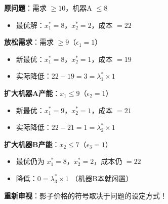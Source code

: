 \documentclass[12pt, a4paper]{ctexart}
\begin{document}
\begin{blackboard}[验证：放松约束后重新求解]

\textbf{原问题}：需求 $\geq 10$，机器A $\leq 8$
\begin{itemize}
    \item 最优解：$x_1^* = 8$，$x_2^* = 2$，成本 $= 22$
\end{itemize}

\textbf{放松需求}：需求 $\geq 9$（$\epsilon_1 = 1$）
\begin{itemize}
    \item 新最优：$x_1^* = 8$，$x_2^* = 1$，成本 $= 19$
    \item 实际降低：$22 - 19 = 3 = \lambda_1^* \times 1$ \checkmark
\end{itemize}

\textbf{扩大机器A产能}：$x_1 \leq 9$（$\epsilon_2 = 1$）
\begin{itemize}
    \item 新最优：$x_1^* = 9$，$x_2^* = 1$，成本 $= 21$
    \item 实际降低：$22 - 21 = 1 = \lambda_2^* \times 1$ \checkmark
\end{itemize}

\textbf{扩大机器B产能}：$x_2 \leq 7$（$\epsilon_3 = 1$）
\begin{itemize}
    \item 最优仍为 $x_1^* = 8$，$x_2^* = 2$，成本仍 $= 22$
    \item 降低：$0 = \lambda_3^* \times 1$ \checkmark（机器B本就闲置）
\end{itemize}

\textbf{重新审视}：影子价格的符号取决于问题的设定方式！

\end{blackboard}
\end{document}
